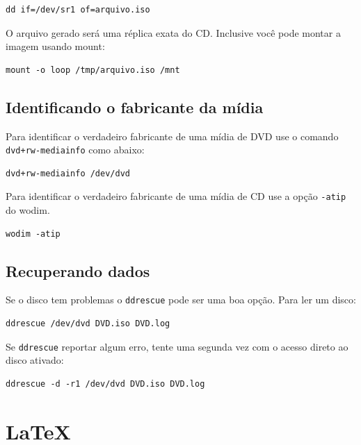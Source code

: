\documentclass[12pt,brazil]{book}
\begin{document}
\begin{verbatim}
dd if=/dev/sr1 of=arquivo.iso
\end{verbatim}

O arquivo gerado será uma réplica exata do CD. Inclusive você pode
montar a imagem usando mount:

\begin{verbatim}
mount -o loop /tmp/arquivo.iso /mnt
\end{verbatim}

\section{Identificando o fabricante da mídia}
\label{sec:ident-o-fabr}

Para identificar o verdadeiro fabricante de uma mídia de DVD use o
comando \texttt{dvd+rw-mediainfo} como abaixo:

\begin{verbatim}
dvd+rw-mediainfo /dev/dvd
\end{verbatim}

Para identificar o verdadeiro fabricante de uma mídia de CD use a
opção \texttt{-atip} do wodim.

\begin{verbatim}
wodim -atip 
\end{verbatim}

\section{Recuperando dados}
\label{sec:recuperando-dados}

Se o disco tem problemas o \texttt{ddrescue} pode ser uma boa opção.
Para ler um disco:

\begin{verbatim}
ddrescue /dev/dvd DVD.iso DVD.log
\end{verbatim}

Se \texttt{ddrescue} reportar algum erro, tente uma segunda vez com o
acesso direto ao disco ativado:

\begin{verbatim}
ddrescue -d -r1 /dev/dvd DVD.iso DVD.log
\end{verbatim}

\chapter{LaTeX}
\label{cha:latex}
\end{document}
